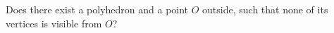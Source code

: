 Does there exist a polyhedron and a point $O$ outside, such that none of its vertices is visible from $O$?
